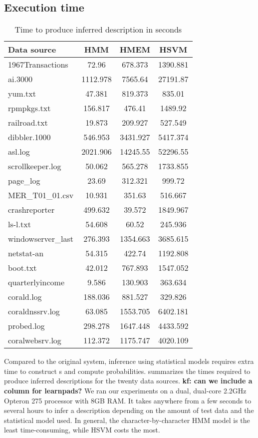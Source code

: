 \subsection{Execution time}
\begin{table}[th]
\begin{center}
\begin{tabular}{|l||c|c|c|}\hline
Data source & HMM & HMEM & HSVM \\ \hline
1967Transactions & 72.96 & 678.373 & 1390.881   \\\hline
ai.3000 & 1112.978 & 7565.64 & 27191.87 \\ \hline
yum.txt & 47.381 &  819.373 & 835.01\\ \hline
rpmpkgs.txt & 156.817 & 476.41 & 1489.92\\ \hline
railroad.txt & 19.873 & 209.927 & 527.549  \\ \hline
dibbler.1000 & 546.953 & 3431.927 & 5417.374   \\ \hline
asl.log & 2021.906 & 14245.55 & 52296.55 \\ \hline
scrollkeeper.log  &  50.062 & 565.278 & 1733.855 \\ \hline
page\_log  & 23.69 & 312.321 & 999.72 \\ \hline
MER\_T01\_01.csv & 10.931 & 351.63 & 516.667 \\ \hline
crashreporter & 499.632 & 39.572 & 1849.967 \\ \hline
ls-l.txt & 54.608 & 60.52 & 245.936 \\ \hline
windowserver\_last & 276.393 & 1354.663 & 3685.615 \\ \hline
netstat-an & 54.315 & 422.74 & 1192.808 \\ \hline
boot.txt & 42.012 &  767.893 & 1547.052 \\ \hline
quarterlyincome & 9.586 & 130.903 & 363.634   \\ \hline
corald.log & 188.036 &  881.527 & 329.826 \\ \hline
coraldnssrv.log  & 63.085 &  1553.705 & 6402.181\\ \hline
probed.log & 298.278 & 1647.448 & 4433.592 \\ \hline
coralwebsrv.log & 112.372 & 1175.747 & 4020.109 \\\hline
\end{tabular}
\caption{Time to produce inferred description in seconds}
\label{tab:time}
\end{center}
\end{table}

Compared to the original \learnpads{} system, inference using
statistical models requires extra time to construct \seqset{}s and
compute probabilities.  summarizes the times required
to produce inferred descriptions for the twenty data sources.
{\bf kf: can we include a column for learnpads?}
We ran our experiments on a dual, dual-core 2.2GHz Opteron 275
processor with 8GB RAM.
It takes anywhere from a few seconds to several hours to
infer a description depending on the amount of test data
and the statistical model used. In general, the character-by-character
HMM model is the least time-consuming, while HSVM costs the most.

